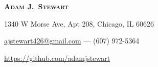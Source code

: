 
\begin{center}

    \textbf{\textsc{\Large Adam J.\ Stewart}}

    1340 W Morse Ave, Apt 208, Chicago, IL 60626

    \href{mailto:ajstewart426@gmail.com}{ajstewart426@gmail.com} --- (607) 972-5364

    \href{https://github.com/adamjstewart}{https://github.com/adamjstewart}

\end{center}

\vspace{-14pt}
